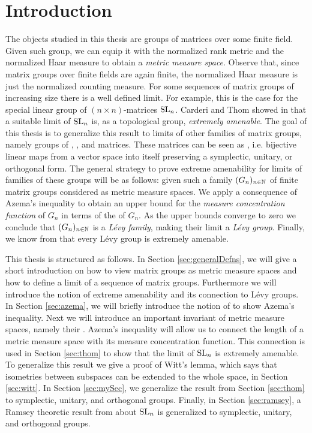 
\section{Introduction}
The objects studied in this thesis are groups of matrices over some finite field.
Given such group, we can equip it with the normalized rank metric and the normalized Haar measure to obtain a \emph{metric measure space}. Observe that, since matrix groups over finite fields are again finite, the normalized Haar measure is just the normalized counting measure.
For some sequences of matrix groups of increasing size there is a well defined limit. For example, this is the case for the special linear group of $(n\times n)$-matrices $\operatorname{SL}_n$.
Carderi and Thom  showed in \cite{thom} that a suitable limit of $\operatorname{SL}_n$ is, as a topological group, \emph{extremely amenable}. The goal of this thesis is to generalize this result to limits of other families of matrix groups, namely groups of , , and  matrices.  
These matrices can be seen as , i.e. bijective linear maps from a vector space into itself preserving a symplectic, unitary, or orthogonal form.
The general strategy to prove extreme amenability for limits of families of these groups will be as follows: given such a family $(G_n)_{n\in\mathbb{N}}$ of finite matrix groups considered as metric measure spaces. We apply a consequence of Azema's inequality \cite{Azema} to obtain an upper bound for the \emph{measure concentration function} of $G_n$ in terms of the  of $G_n$.
As the upper bounds converge to zero we conclude that $(G_n)_{n\in\mathbb{N}}$ is a \emph{L\'{e}vy family}, making their limit a \emph{L\'{e}vy group}. Finally, we know from \cite{Levy} that every L\'{e}vy group is extremely amenable.

This thesis is structured as follows. In Section \ref{sec:generalDefns}, we will give a short introduction on how to view matrix groups as metric measure spaces and how to define a limit of a sequence of matrix groups. Furthermore we will introduce the notion of extreme amenability and its connection to L\'evy groups. In Section \ref{sec:azema}, we will briefly introduce the notion of  to show Azema's inequality. Next we will introduce an important invariant of metric measure spaces, namely their . Azema's inequality will allow us to connect the length of a metric measure space with its measure concentration function. This connection is used in Section \ref{sec:thom} to show that the limit of $\operatorname{SL}_n$ is extremely amenable. To generalize this result we give a proof of Witt's lemma, which says that isometries between subspaces can be extended to the whole space, in Section \ref{sec:witt}. In Section \ref{sec:mySec}, we generalize the result from Section \ref{sec:thom} to symplectic, unitary, and orthogonal groups. Finally, in Section \ref{sec:ramsey}, a Ramsey theoretic result from \cite{thom} about $\operatorname{SL}_n$ is generalized to symplectic, unitary, and orthogonal groups.

